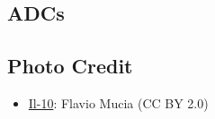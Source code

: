 \subsection{ADCs}
\begin{adclist}
\end{adclist}

\subsection{Photo Credit}
\begin{itemize}\raggedright
    \item \href{https://commons.wikimedia.org/wiki/File:Ilyushin_Il-10_(China_Aviation_Museum).jpg}{Il-10}: Flavio Mucia (CC BY 2.0)
\end{itemize}
